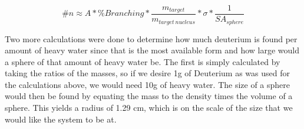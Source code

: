 \documentclass[%
12pt,
twoside,
reprint,
amsmath,amssymb,
aps,
]{article}
\begin{document}
	\begin{equation}
	\#n \approx A * \% Branching * \frac{m_{target}}{m_{target\ nucleus}} * \sigma * \frac{1}{SA_{sphere}}
	\end{equation}
	
	\par Two more calculations were done to determine how much deuterium is found per amount of heavy water since that is the most available form and how large would a sphere of that amount of heavy water be. The first is simply calculated by taking the ratios of the masses, so if we desire 1g of Deuterium as was used for the calculations above, we would need 10g of heavy water. The size of a sphere would then be found by equating the mass to the density times the volume of a sphere. This yields a radius of 1.29 cm, which is on the scale of the size that we would like the system to be at.
	
\end{document}

